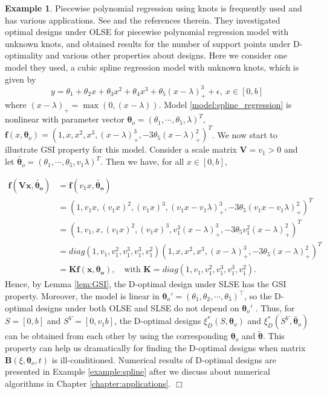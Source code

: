 \documentclass[
]{book}
\theoremstyle{definition}
\theoremstyle{definition}
\newtheorem{example}{Example}[chapter]
\theoremstyle{definition}
\theoremstyle{definition}
\theoremstyle{remark}
\begin{document}
\begin{example}
Piecewise polynomial regression using knots is frequently used and has various applications. See \citet{dette2008optimal} and the references therein. They investigated optimal designs under OLSE for piecewise polynomial regression model with unknown knots, and obtained results for the number of support points under D-optimality and various other properties about designs. Here we consider one model they used, a cubic spline regression model with unknown knots, which is given by
\begin{equation}
y=\theta_1+\theta_2x+\theta_3x^2+\theta_4x^3+\theta_5(x-\lambda)_{+}^3+\epsilon,~x\in [0,b]
\label{eq:spline-regression}
\end{equation}
where \((x-\lambda)_{+} = \max(0,(x-\lambda))\). Model \eqref{model:spline_regression} is nonlinear with parameter vector \(\boldsymbol{\theta}_o=(\theta_1,\cdots,\theta_5,\lambda)^T\), \(\boldsymbol{f}(x,\boldsymbol{\theta}_o)=(1,x,x^2,x^3,(x-\lambda)_+^3,-3\theta_5(x-\lambda)_+^2)^T\). We now start to illustrate GSI property for this model. Consider a scale matrix \(\boldsymbol{V}=v_1>0\) and let \(\tilde{\boldsymbol{\theta}_o}=(\theta_1,\cdots,\theta_5,v_1\lambda)^T\). Then we have, for all \(x\in[0,b]\),

\begin{equation*}
\begin{aligned}
\boldsymbol{f}(\boldsymbol{V}\boldsymbol{x},\tilde{\boldsymbol{\theta_o}})  
        &= \boldsymbol{f}(v_1x,\tilde{\boldsymbol{\theta_o}})\\
        &= (1, v_1x,  (v_1x)^2,  (v_1x)^3,  (v_1x-v_1\lambda)_+^3,  -3\theta_5(v_1x-v_1\lambda)_+^2)^T\\
        &= (1,  v_1,x,  (v_1x)^2,  (v_1x)^3,  v_1^3(x-\lambda)_+^3,  -3\theta_5v_1^2(x-\lambda)_+^2 )^T\\
        &= diag(1,v_1,v_1^2,v_1^3,v_1^3,v_1^2) (1, x,  x^2, x^3, (x-\lambda)_+^3, -3\theta_5(x-\lambda)_+^2)^T\\
        &=\boldsymbol{K}\boldsymbol{f}(\boldsymbol{x},\boldsymbol{\theta_o}),\quad \text{with } \boldsymbol{K}=diag(1,v_1,v_1^2,v_1^3,v_1^3,v_1^2).
\end{aligned}
\end{equation*}
Hence, by Lemma \ref{lem:GSI}, the D-optimal design under SLSE has the GSI property. Moreover, the model is linear in \(\boldsymbol{\theta}_o'=(\theta_1,\theta_2,\cdots,\theta_5)^\top\), so the D-optimal designs under both OLSE and SLSE do not depend on \(\boldsymbol{\theta}_o'\) \citet{yin2018optimal}. Thus, for \(S=[0,b]\) and \(S^{V}=[0,v_1b]\), the D-optimal designs \(\xi_D^*(S,\boldsymbol{\theta}_o)\) and \(\xi_D^*(S^V,\tilde{\boldsymbol{\theta}_o})\) can be obtained from each other by using the corresponding \(\boldsymbol{\theta}_o\) and \(\tilde{\boldsymbol{\theta}}\). This property can help us dramatically for finding the D-optimal designs when matrix \(\boldsymbol{B}(\xi,\boldsymbol{\theta}_o,t)\) is ill-conditioned. Numerical results of D-optimal designs are presented in Example \ref{example:spline} after we discuss about numerical algorithms in Chapter \ref{chapter:applications}. \hfill\(\Box\)
\end{example}
\end{document}
